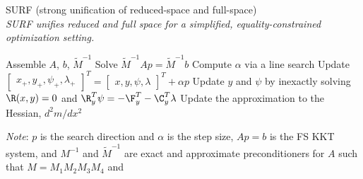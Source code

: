 \begin{algorithm}[ht]
    \small
    \caption{
        SURF (strong unification of reduced-space and full-space) \\ 
        \emph{SURF unifies reduced and full space for a simplified, equality-constrained optimization setting.}
    }
    \begin{algorithmic}[1]
        \Loop
            \State Assemble $A$, $b$, $\tilde M^{-1}$
            \State Solve $\tilde M^{-1} A p = \tilde M^{-1} b$
            \State Compute $\alpha$ via a line search
            \State Update $
                \begin{bmatrix}
                    x_+ ,
                    y_+ ,
                    \psi_+ ,
                    \lambda_+ 
                \end{bmatrix}^T
                =
                \begin{bmatrix}
                    x ,
                    y ,
                    \psi ,
                    \lambda 
                \end{bmatrix}^T
                + \alpha p
            $
            \State Update $y$ and $\psi$ by inexactly solving $\R(x,y)=0$ and
            $\R_y^T \psi = -\F_y^T - \C_y^T \lambda$
            \State Update the approximation to the Hessian, ${d^2m/dx^2}$
        \EndLoop
    \end{algorithmic}

    \emph{Note}: 
    $p$ is the search direction and $\alpha$ is the step size,
    $Ap=b$ is the FS KKT system,
    and $M^{-1}$ and $\tilde M^{-1}$ are exact and approximate preconditioners for $A$ such that
    $M = M_1 M_2 M_3 M_4$ and


\end{algorithm}

